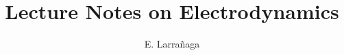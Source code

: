 \documentclass[10pt,letterpaper]{book}
\begin{document}
\title{Lecture Notes on Electrodynamics}
\author{E. Larra\~{n}aga}

\maketitle





\end{document}
